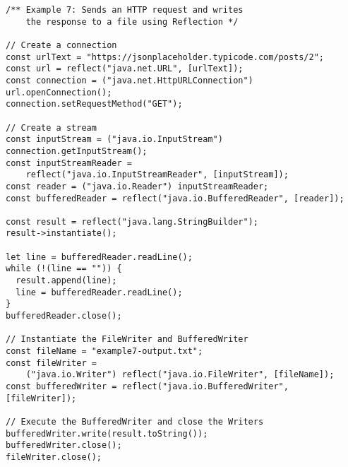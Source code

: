 \vspace{-2.25em}
\begin{center}
\begin{minipage}[t]{1\textwidth}
\begin{listing}[H]
\begin{spacing}{0.6}
\begin{verbatim}
/** Example 7: Sends an HTTP request and writes
    the response to a file using Reflection */

// Create a connection
const urlText = "https://jsonplaceholder.typicode.com/posts/2";
const url = reflect("java.net.URL", [urlText]);
const connection = ("java.net.HttpURLConnection") url.openConnection();
connection.setRequestMethod("GET");

// Create a stream
const inputStream = ("java.io.InputStream") connection.getInputStream();
const inputStreamReader =
    reflect("java.io.InputStreamReader", [inputStream]);
const reader = ("java.io.Reader") inputStreamReader;
const bufferedReader = reflect("java.io.BufferedReader", [reader]);

const result = reflect("java.lang.StringBuilder");
result->instantiate();

let line = bufferedReader.readLine();
while (!(line == "")) {
  result.append(line);
  line = bufferedReader.readLine();
}
bufferedReader.close();

// Instantiate the FileWriter and BufferedWriter
const fileName = "example7-output.txt";
const fileWriter =
    ("java.io.Writer") reflect("java.io.FileWriter", [fileName]);
const bufferedWriter = reflect("java.io.BufferedWriter", [fileWriter]);

// Execute the BufferedWriter and close the Writers
bufferedWriter.write(result.toString());
bufferedWriter.close();
fileWriter.close();
\end{verbatim}
\end{spacing}
\end{listing}
\end{minipage}
\end{center}

